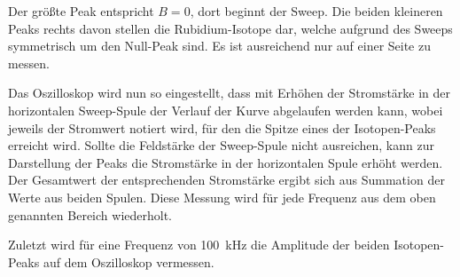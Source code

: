     Der größte Peak entspricht $B = 0$,
    dort beginnt der Sweep.
    Die beiden kleineren Peaks rechts davon stellen die Rubidium-Isotope dar,
    welche aufgrund des Sweeps symmetrisch um den Null-Peak sind.
    Es ist ausreichend nur auf einer Seite zu messen.

    Das Oszilloskop wird nun so eingestellt,
    dass mit Erhöhen der Stromstärke in der horizontalen Sweep-Spule der Verlauf der Kurve abgelaufen werden kann,
    wobei jeweils der Stromwert notiert wird,
    für den die Spitze eines der Isotopen-Peaks erreicht wird.
    Sollte die Feldstärke der Sweep-Spule nicht ausreichen,
    kann zur Darstellung der Peaks die Stromstärke in der horizontalen Spule erhöht werden.
    Der Gesamtwert der entsprechenden Stromstärke ergibt sich aus Summation der Werte aus beiden Spulen.
    Diese Messung wird für jede Frequenz aus dem oben genannten Bereich wiederholt.

    Zuletzt wird für eine Frequenz von \SI{100}{\kilo\hertz} die Amplitude der beiden Isotopen-Peaks auf dem Oszilloskop vermessen.
